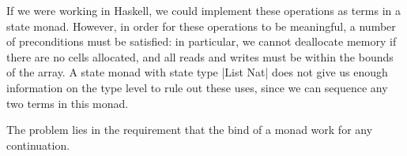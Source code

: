\documentclass{article}
\theoremstyle{definition}
\begin{document}
    If we were working in Haskell, we could implement these operations as terms in a state monad.  However, in order for
    these operations to be meaningful, a number of preconditions must be satisfied: in particular, we cannot deallocate
    memory if there are no cells allocated, and all reads and writes must be within the bounds of the array.  A state
    monad with state type |List Nat| does not give us enough information on the type level to rule out these uses, since
    we can sequence any two terms in this monad.

    The problem lies in the requirement that the bind of a monad work for any continuation.
\end{document}
